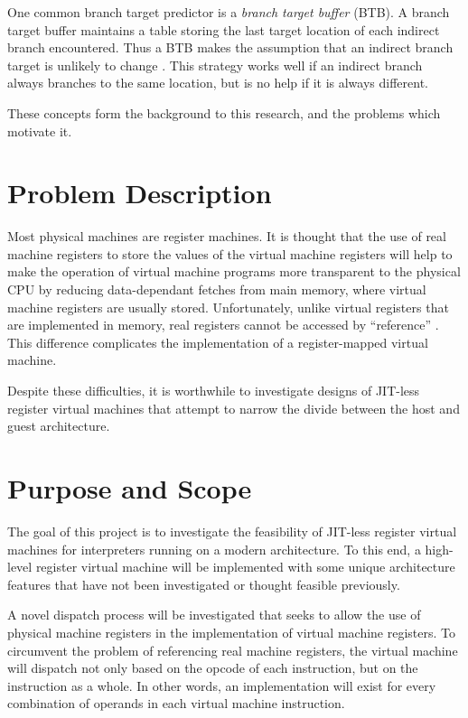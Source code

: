 			One common branch target predictor is a \emph{branch target buffer} (BTB). A branch target buffer maintains a table storing the last target location of each indirect branch encountered. Thus a BTB makes the assumption that an indirect branch target is unlikely to change  \citep{yeti}. This strategy works well if an indirect branch always branches to the same location, but is no help if it is always different.
			
			These concepts form the background to this research, and the problems which motivate it.
	
	\section{Problem Description}
		Most physical machines are register machines. It is thought that the use of real machine registers to store the values of the virtual machine registers will help to make the operation of virtual machine programs more transparent to the physical CPU by reducing data-dependant fetches from main memory, where virtual machine registers are usually stored. Unfortunately, unlike virtual registers that are implemented in memory, real registers cannot be accessed by ``reference'' \citep{caseregistervm}. This difference complicates the implementation of a register-mapped virtual machine.
		
		Despite these difficulties, it is worthwhile to investigate designs of JIT-less register virtual machines that attempt to narrow the divide between the host and guest architecture.
	
		
	\section{Purpose and Scope}
		The goal of this project is to investigate the feasibility of JIT-less register virtual machines for interpreters running on a modern architecture. To this end, a high-level register virtual machine will be implemented with some unique architecture features that have not been investigated or thought feasible previously.
		
		A novel dispatch process will be investigated that seeks to allow the use of physical machine registers in the implementation of virtual machine registers. To circumvent the problem of referencing real machine registers, the virtual machine will dispatch not only based on the opcode of each instruction, but on the instruction as a whole. In other words, an implementation will exist for every combination of operands in each virtual machine instruction.
	
